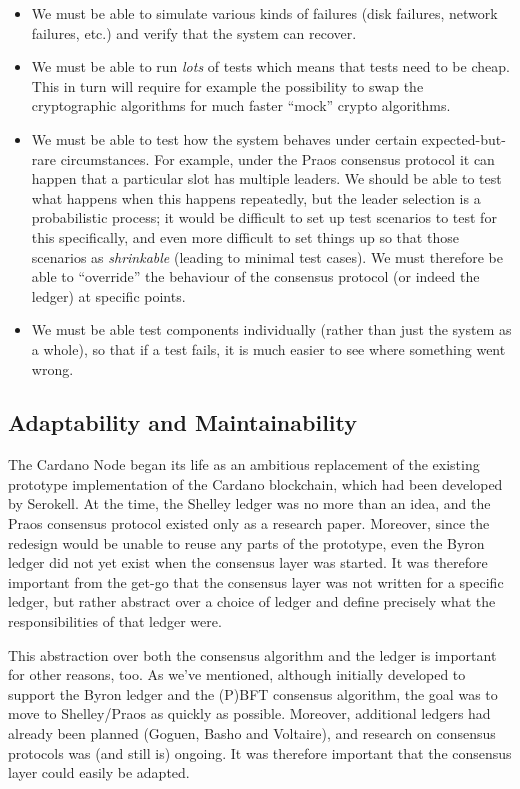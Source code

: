 \begin{itemize}
\item We must be able to simulate various kinds of failures (disk
failures, network failures, etc.) and verify that the system can recover.
\item We must be able to run \emph{lots} of tests which means that tests need to
be cheap. This in turn will require for example the possibility to swap the
cryptographic algorithms for much faster ``mock'' crypto algorithms.
\item We must be able to test how the system behaves under certain
expected-but-rare circumstances. For example, under the Praos consensus
protocol it can happen that a particular slot has multiple leaders. We should be
able to test what happens when this happens repeatedly, but the leader selection
is a probabilistic process; it would be difficult to set up test scenarios to
test for this specifically, and even more difficult to set things up so that
those scenarios as \emph{shrinkable} (leading to minimal test cases). We must
therefore be able to ``override'' the behaviour of the consensus protocol (or
indeed the ledger) at specific points.
\item We must be able test components individually (rather than just the system
as a whole), so that if a test fails, it is much easier to see where something
went wrong.
\end{itemize}

\subsection{Adaptability and Maintainability}
\label{adaptability}

The Cardano Node began its life as an ambitious replacement of the existing
prototype implementation of the Cardano blockchain, which had been developed
by Serokell. At the time, the Shelley ledger was no more than an idea, and
the Praos consensus protocol existed only as a research paper. Moreover, since
the redesign would be unable to reuse any parts of the prototype, even the
Byron ledger did not yet exist when the consensus layer was started.
It was therefore important from the get-go that the consensus layer was not
written for a specific ledger, but rather abstract over a choice of ledger
and define precisely what the responsibilities of that ledger were.

This abstraction over both the consensus algorithm and the ledger is important
for other reasons, too. As we've mentioned, although initially developed to
support the Byron ledger and the (P)BFT consensus algorithm, the goal was to
move to Shelley/Praos as quickly as possible. Moreover, additional ledgers had
already been planned (Goguen, Basho and Voltaire), and research on consensus
protocols was (and still is) ongoing. It was therefore important that the
consensus layer could easily be adapted.

